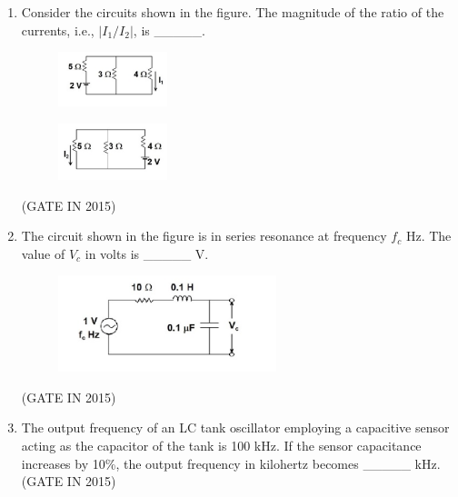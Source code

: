 \documentclass[journal]{IEEEtran}
\begin{document}
\begin{enumerate}
\item Consider the circuits shown in the figure. The magnitude of the ratio of the currents, i.e., $|I_1/I_2|$, is \_\_\_\_\_.
\begin{multicols}{2}
\begin{figure}[H]
      \includegraphics[width=0.3\textwidth]{15.png} 
      \caption{}
    \label{fig:fig15} 
\end{figure}
\begin{figure}[H]
      \includegraphics[width=0.3\textwidth]{16.png} 
      \caption{}
    \label{fig:fig16} 
\end{figure}
\end{multicols}
\hfill(GATE IN 2015)

\item The circuit shown in the figure is in series resonance at frequency $f_c$ Hz. The value of $V_c$ in volts is \_\_\_\_\_ V.
\begin{figure}[H]
    \centering
      \includegraphics[width=0.6\textwidth]{17.png} 
      \caption{}
    \label{fig:fig17} 
\end{figure}
\hfill(GATE IN 2015)

\item The output frequency of an LC tank oscillator employing a capacitive sensor acting as the capacitor of the tank is 100 kHz. If the sensor capacitance increases by 10\%, the output frequency in kilohertz becomes \_\_\_\_\_ kHz.
 \hfill(GATE IN 2015)


\end{enumerate}
\end{document}
